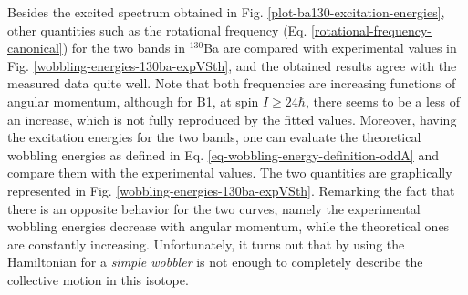 Besides the excited spectrum obtained in Fig. \ref{plot-ba130-excitation-energies}, other quantities such as the rotational frequency (Eq. \ref{rotational-frequency-canonical}) for the two bands in $^{130}$Ba are compared with experimental values in Fig. \ref{wobbling-energies-130ba-expVSth}, and the obtained results agree with the measured data quite well. Note that both frequencies are increasing functions of angular momentum, although for B1, at spin $I\geq 24\hbar$, there seems to be a less of an increase, which is not fully reproduced by the fitted values. Moreover, having the excitation energies for the two bands, one can evaluate the theoretical wobbling energies as defined in Eq. \ref{eq-wobbling-energy-definition-oddA} and compare them with the experimental values. The two quantities are graphically represented in Fig. \ref{wobbling-energies-130ba-expVSth}. Remarking the fact that there is an opposite behavior for the two curves, namely the experimental wobbling energies decrease with angular momentum, while the theoretical ones are constantly increasing. Unfortunately, it turns out that by using the Hamiltonian for a \emph{simple wobbler} is not enough to completely describe the collective motion in this isotope.

